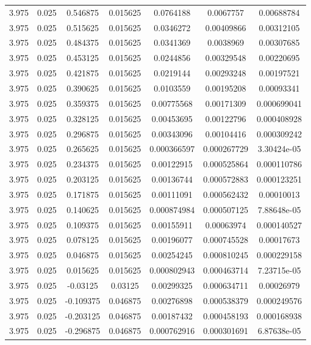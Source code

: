 \begin{flushleft}
\begin{longtable}{ccccccc}
3.975 & 0.025 & 0.546875 & 0.015625 & 0.0764188 & 0.0067757 & 0.00688784  \\ 
3.975 & 0.025 & 0.515625 & 0.015625 & 0.0346272 & 0.00409866 & 0.00312105  \\ 
3.975 & 0.025 & 0.484375 & 0.015625 & 0.0341369 & 0.0038969 & 0.00307685  \\ 
3.975 & 0.025 & 0.453125 & 0.015625 & 0.0244856 & 0.00329548 & 0.00220695  \\ 
3.975 & 0.025 & 0.421875 & 0.015625 & 0.0219144 & 0.00293248 & 0.00197521  \\ 
3.975 & 0.025 & 0.390625 & 0.015625 & 0.0103559 & 0.00195208 & 0.00093341  \\ 
3.975 & 0.025 & 0.359375 & 0.015625 & 0.00775568 & 0.00171309 & 0.000699041  \\ 
3.975 & 0.025 & 0.328125 & 0.015625 & 0.00453695 & 0.00122796 & 0.000408928  \\ 
3.975 & 0.025 & 0.296875 & 0.015625 & 0.00343096 & 0.00104416 & 0.000309242  \\ 
3.975 & 0.025 & 0.265625 & 0.015625 & 0.000366597 & 0.000267729 & 3.30424e-05  \\ 
3.975 & 0.025 & 0.234375 & 0.015625 & 0.00122915 & 0.000525864 & 0.000110786  \\ 
3.975 & 0.025 & 0.203125 & 0.015625 & 0.00136744 & 0.000572883 & 0.000123251  \\ 
3.975 & 0.025 & 0.171875 & 0.015625 & 0.00111091 & 0.000562432 & 0.00010013  \\ 
3.975 & 0.025 & 0.140625 & 0.015625 & 0.000874984 & 0.000507125 & 7.88648e-05  \\ 
3.975 & 0.025 & 0.109375 & 0.015625 & 0.00155911 & 0.00063974 & 0.000140527  \\ 
3.975 & 0.025 & 0.078125 & 0.015625 & 0.00196077 & 0.000745528 & 0.00017673  \\ 
3.975 & 0.025 & 0.046875 & 0.015625 & 0.00254245 & 0.000810245 & 0.000229158  \\ 
3.975 & 0.025 & 0.015625 & 0.015625 & 0.000802943 & 0.000463714 & 7.23715e-05  \\ 
3.975 & 0.025 & -0.03125 & 0.03125 & 0.00299325 & 0.000634711 & 0.00026979  \\ 
3.975 & 0.025 & -0.109375 & 0.046875 & 0.00276898 & 0.000538379 & 0.000249576  \\ 
3.975 & 0.025 & -0.203125 & 0.046875 & 0.00187432 & 0.000458193 & 0.000168938  \\ 
3.975 & 0.025 & -0.296875 & 0.046875 & 0.000762916 & 0.000301691 & 6.87638e-05  \\ 

\end{longtable}
\end{flushleft}
